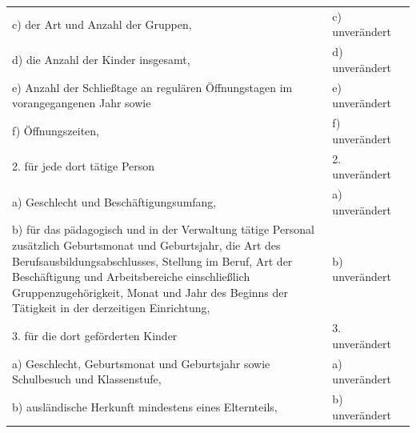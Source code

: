 \documentclass[10pt,a4paper,landscape]{article}
\begin{document}
\begin{longtable}{|L{8.2cm}|L{8.2cm}|L{8.2cm}|}
c)   \newline der Art und Anzahl der Gruppen, & c) unverändert &  \\
\hhline{|---|}
d)   \newline die Anzahl der Kinder insgesamt, & d) unverändert &  \\
\hhline{|---|}
e)   \newline Anzahl der Schließtage an regulären  \newline Öffnungstagen im vorangegangenen Jahr  \newline sowie & e) unverändert &  \\
\hhline{|---|}
f)   \newline Öffnungszeiten, & f) unverändert &  \\
\hhline{|---|}
2.   \newline für jede dort tätige Person & 2. unverändert &  \\
\hhline{|---|}
a)   \newline Geschlecht und Beschäftigungsumfang, & a) unverändert &  \\
\hhline{|---|}
b)   \newline für das pädagogisch und in der Verwaltung  \newline tätige Personal zusätzlich Geburtsmonat  \newline und Geburtsjahr, die Art des  \newline Berufsausbildungsabschlusses, Stellung im  \newline Beruf, Art der Beschäftigung und  \newline Arbeitsbereiche einschließlich  \newline Gruppenzugehörigkeit, Monat und Jahr des  \newline Beginns der Tätigkeit in der derzeitigen  \newline Einrichtung, & b) unverändert &  \\
\hhline{|---|}
3.   \newline für die dort geförderten Kinder & 3. unverändert &  \\
\hhline{|---|}
a)   \newline Geschlecht, Geburtsmonat und  \newline Geburtsjahr sowie Schulbesuch und  \newline Klassenstufe, & a) unverändert &  \\
\hhline{|---|}
b)   \newline ausländische Herkunft mindestens eines  \newline Elternteils, & b) unverändert &  \\

\end{longtable}
\end{document}
